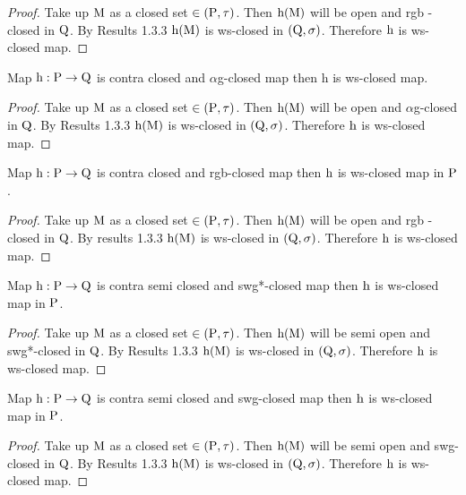 \begin{proof}
Take up $\mathrm{M}$ as a closed set $\in (\mathrm{P}, \tau)$. Then $\mathrm{h} (\mathrm{M})$ will be open and rgb - closed in $\mathrm{Q}$. By Results 1.3.3 $\mathrm{h} (\mathrm{M})$ is ws-closed in $(\mathrm{Q}, \sigma)$. Therefore $\mathrm{h}$ is ws-closed map.
\end{proof}

\begin{thm}\label{thm4.2.17}
Map $\mathrm{h}: \mathrm{P} \to \mathrm{Q}$ is contra closed and $\alpha$g-closed map then h is ws-closed map.
\end{thm}

\begin{proof}
Take up $\mathrm{M}$ as a closed set $\in (\mathrm{P}, \tau)$. Then $\mathrm{h} (\mathrm{M})$ will be open and $\alpha$g-closed in $\mathrm{Q}$. By Results 1.3.3 $\mathrm{h} (\mathrm{M})$ is ws-closed in $(\mathrm{Q}, \sigma)$. Therefore $\mathrm{h}$ is ws-closed map.
\end{proof}

\begin{thm}\label{thm4.2.18}
Map $\mathrm{h}: \mathrm{P} \to \mathrm{Q}$ is contra closed and rgb-closed map then $\mathrm{h}$ is ws-closed map in $\mathrm{P}$.
\end{thm}

\begin{proof}
Take up $\mathrm{M}$ as a closed set $\in (\mathrm{P}, \tau)$. Then $\mathrm{h} (\mathrm{M})$ will be open and rgb - closed in $\mathrm{Q}$. By results 1.3.3 $\mathrm{h}(\mathrm{M})$ is ws-closed in $(\mathrm{Q}, \sigma)$. Therefore $\mathrm{h}$ is ws-closed map.
\end{proof}

\begin{thm}\label{thm4.2.19}
Map $\mathrm{h}: \mathrm{P} \to \mathrm{Q}$ is contra semi closed and swg*-closed map then $\mathrm{h}$ is ws-closed map in $\mathrm{P}$.
\end{thm}

\begin{proof}
Take up $\mathrm{M}$ as a closed set $\in (\mathrm{P}, \tau)$. Then $\mathrm{h} (\mathrm{M})$ will be semi open and swg*-closed in $\mathrm{Q}$. By Results 1.3.3 $\mathrm{h}(\mathrm{M})$ is ws-closed in $(\mathrm{Q}, \sigma)$. Therefore $\mathrm{h}$ is ws-closed map.
\end{proof}

\begin{thm}\label{thm4.2.20}
Map $\mathrm{h}: \mathrm{P} \to \mathrm{Q}$ is contra semi closed and swg-closed map then $\mathrm{h}$ is ws-closed map in $\mathrm{P}$.
\end{thm}

\begin{proof}
Take up $\mathrm{M}$ as a closed set $\in (\mathrm{P}, \tau)$. Then $\mathrm{h} (\mathrm{M})$ will be semi open and swg-closed in $\mathrm{Q}$. By Results 1.3.3 $\mathrm{h} (\mathrm{M})$ is ws-closed in $(\mathrm{Q}, \sigma)$. Therefore $\mathrm{h}$ is ws-closed map.
\end{proof}

